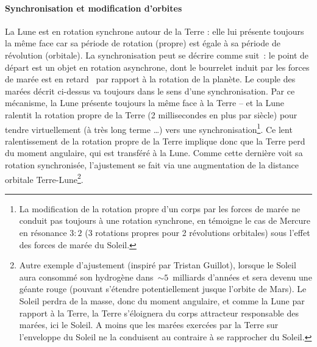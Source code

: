 \paragraph{Synchronisation et modification d'orbites} La Lune est en rotation synchrone autour de la Terre : elle lui présente toujours la même face car sa période de rotation (propre) est égale à sa période de révolution (orbitale). La synchronisation peut se décrire comme suit~: le point de départ est un objet en rotation asynchrone, dont le bourrelet induit par les forces de marée est \og en retard \fg~par rapport à la rotation de la planète. Le couple des marées décrit ci-dessus va toujours dans le sens d'une synchronisation. Par ce mécanisme, la Lune présente toujours la même face à la Terre -- et la Lune ralentit la rotation propre de la Terre (2 millisecondes en plus par siècle) pour tendre virtuellement (à très long terme \ldots) vers une synchronisation\footnote{La modification de la rotation propre d'un corps par les forces de marée ne conduit pas toujours à une rotation synchrone, en témoigne le cas de Mercure en résonance $3:2$ (3 rotations propres pour 2 révolutions orbitales) sous l'effet des forces de marée du Soleil.}.
Ce lent ralentissement de la rotation propre de la Terre implique donc que la Terre perd du moment angulaire, qui est transféré à la Lune. Comme cette dernière voit sa rotation synchronisée, l'ajustement se fait via une augmentation de la distance orbitale Terre-Lune\footnote{Autre exemple d'ajustement (inspiré par Tristan Guillot), lorsque le Soleil aura consommé son hydrogène dans~$\sim 5$~milliards d'années et sera devenu une géante rouge (pouvant s'étendre potentiellement jusque l'orbite de Mars). Le Soleil perdra de la masse, donc du moment angulaire, et comme la Lune par rapport à la Terre, la Terre s'éloignera du corps attracteur responsable des marées, ici le Soleil. A moins que les marées exercées par la Terre sur l'enveloppe du Soleil ne la conduisent au contraire à se rapprocher du Soleil.}. 
